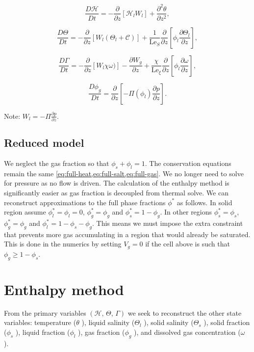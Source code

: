\documentclass[a4paper,11pt]{article}
\numberwithin{equation}{section}
\begin{document}
\begin{equation}\label{eq:full-heat}
\frac{D \mathcal{H}}{D t} =
-\frac{\partial}{\partial z} \left[ \mathcal{H}_l W_l \right]
+ \frac{\partial^2 \theta}{\partial z^2},
\end{equation}

\begin{equation}\label{eq:full-salt}
\frac{D \Theta}{D t} =
-\frac{\partial}{\partial z} \left[ W_l (\Theta_l + \mathcal{C}) \right] 
+ \frac{1}{\text{Le}_S} \frac{\partial}{\partial z} \left[ \phi_l \frac{\partial \Theta_l}{\partial z} \right],
\end{equation}

\begin{equation}\label{eq:full-gas}
\frac{D \Gamma}{D t} =
-\frac{\partial}{\partial z} \left[ W_l \chi \omega) \right] 
- \frac{\partial W_g}{\partial z}
+ \frac{\chi}{\text{Le}_\xi} \frac{\partial}{\partial z} \left[ \phi_l \frac{\partial \omega}{\partial z} \right],
\end{equation}

\begin{equation}\label{eq:pressure}
\frac{D \phi_g}{D t} = \frac{\partial}{\partial z} \left[ - \Pi(\phi_l) \frac{\partial p}{\partial z} \right].
\end{equation}

Note: $W_l = -\Pi \frac{\partial p}{\partial z}$.

\subsection{Reduced model}\label{sec:Reduced-model}

We neglect the gas fraction so that $\phi_s + \phi_l = 1$.
The conservation equations remain the same \cref{eq:full-heat,eq:full-salt,eq:full-gas}.
We no longer need to solve for pressure as no flow is driven.
The calculation of the enthalpy method is significantly easier as gas fraction is decoupled from thermal solve.
We can reconstruct approximations to the full phase fractions $\phi^*$ as follows.
In solid region assume $\phi_l^* = \phi_l = 0$, $\phi_g^*=\phi_g$ and $\phi_s^* = 1- \phi_g$.
In other regions  $\phi_s^* = \phi_s$,  $\phi_g^* = \phi_g$ and $\phi_l^* = 1 - \phi_s - \phi_g$.
This means we must impose the extra constraint that prevents more gas accumulating in a region that would already be saturated.
This is done in the numerics by setting  $V_g=0$ if the cell above is such that $\phi_g \ge  1- \phi_s$.

\section{Enthalpy method}\label{sec:Enthalpy-method}
From the primary variables $(\mathcal{H}, \, \Theta, \, \Gamma)$ we seek to reconstruct the other state variables:
temperature ($\theta$ ),
liquid salinity ($\Theta_l$ ),
solid salinity ($\Theta_s$ ),
solid fraction ($\phi_s$ ),
liquid fraction ($\phi_l$ ),
gas fraction ($\phi_g$ ),
and dissolved gas concentration ($\omega$ ).
\end{document}
